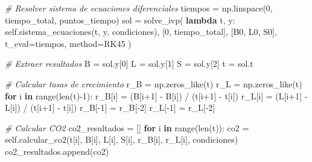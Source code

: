 \documentclass[
]{article}
\newenvironment{Shaded}{}{}
\newcommand{\BuiltInTok}[1]{\textcolor[rgb]{0.00,0.50,0.00}{#1}}
\newcommand{\CommentTok}[1]{\textcolor[rgb]{0.38,0.63,0.69}{\textit{#1}}}
\newcommand{\ControlFlowTok}[1]{\textcolor[rgb]{0.00,0.44,0.13}{\textbf{#1}}}
\newcommand{\DecValTok}[1]{\textcolor[rgb]{0.25,0.63,0.44}{#1}}
\newcommand{\KeywordTok}[1]{\textcolor[rgb]{0.00,0.44,0.13}{\textbf{#1}}}
\newcommand{\NormalTok}[1]{#1}
\newcommand{\OperatorTok}[1]{\textcolor[rgb]{0.40,0.40,0.40}{#1}}
\newcommand{\StringTok}[1]{\textcolor[rgb]{0.25,0.44,0.63}{#1}}
\newcommand{\VariableTok}[1]{\textcolor[rgb]{0.10,0.09,0.49}{#1}}
\begin{document}
\begin{Shaded}
\begin{Highlighting}[]
        \CommentTok{\# Resolver sistema de ecuaciones diferenciales}
\NormalTok{        tiempos }\OperatorTok{=}\NormalTok{ np.linspace(}\DecValTok{0}\NormalTok{, tiempo\_total, puntos\_tiempo)}
\NormalTok{        sol }\OperatorTok{=}\NormalTok{ solve\_ivp(}
            \KeywordTok{lambda}\NormalTok{ t, y: }\VariableTok{self}\NormalTok{.sistema\_ecuaciones(t, y, condiciones),}
\NormalTok{            [}\DecValTok{0}\NormalTok{, tiempo\_total],}
\NormalTok{            [B0, L0, S0],}
\NormalTok{            t\_eval}\OperatorTok{=}\NormalTok{tiempos,}
\NormalTok{            method}\OperatorTok{=}\StringTok{\textquotesingle{}RK45\textquotesingle{}}
\NormalTok{        )}
        
        \CommentTok{\# Extraer resultados}
\NormalTok{        B }\OperatorTok{=}\NormalTok{ sol.y[}\DecValTok{0}\NormalTok{]}
\NormalTok{        L }\OperatorTok{=}\NormalTok{ sol.y[}\DecValTok{1}\NormalTok{]}
\NormalTok{        S }\OperatorTok{=}\NormalTok{ sol.y[}\DecValTok{2}\NormalTok{]}
\NormalTok{        t }\OperatorTok{=}\NormalTok{ sol.t}
        
        \CommentTok{\# Calcular tasas de crecimiento}
\NormalTok{        r\_B }\OperatorTok{=}\NormalTok{ np.zeros\_like(t)}
\NormalTok{        r\_L }\OperatorTok{=}\NormalTok{ np.zeros\_like(t)}
        \ControlFlowTok{for}\NormalTok{ i }\KeywordTok{in} \BuiltInTok{range}\NormalTok{(}\BuiltInTok{len}\NormalTok{(t)}\OperatorTok{{-}}\DecValTok{1}\NormalTok{):}
\NormalTok{            r\_B[i] }\OperatorTok{=}\NormalTok{ (B[i}\OperatorTok{+}\DecValTok{1}\NormalTok{] }\OperatorTok{{-}}\NormalTok{ B[i]) }\OperatorTok{/}\NormalTok{ (t[i}\OperatorTok{+}\DecValTok{1}\NormalTok{] }\OperatorTok{{-}}\NormalTok{ t[i])}
\NormalTok{            r\_L[i] }\OperatorTok{=}\NormalTok{ (L[i}\OperatorTok{+}\DecValTok{1}\NormalTok{] }\OperatorTok{{-}}\NormalTok{ L[i]) }\OperatorTok{/}\NormalTok{ (t[i}\OperatorTok{+}\DecValTok{1}\NormalTok{] }\OperatorTok{{-}}\NormalTok{ t[i])}
\NormalTok{        r\_B[}\OperatorTok{{-}}\DecValTok{1}\NormalTok{] }\OperatorTok{=}\NormalTok{ r\_B[}\OperatorTok{{-}}\DecValTok{2}\NormalTok{]}
\NormalTok{        r\_L[}\OperatorTok{{-}}\DecValTok{1}\NormalTok{] }\OperatorTok{=}\NormalTok{ r\_L[}\OperatorTok{{-}}\DecValTok{2}\NormalTok{]}
        
        \CommentTok{\# Calcular CO2}
\NormalTok{        co2\_resultados }\OperatorTok{=}\NormalTok{ []}
        \ControlFlowTok{for}\NormalTok{ i }\KeywordTok{in} \BuiltInTok{range}\NormalTok{(}\BuiltInTok{len}\NormalTok{(t)):}
\NormalTok{            co2 }\OperatorTok{=} \VariableTok{self}\NormalTok{.calcular\_co2(t[i], B[i], L[i], S[i], r\_B[i], r\_L[i], condiciones)}
\NormalTok{            co2\_resultados.append(co2)}
        

\end{Highlighting}
\end{Shaded}
\end{document}
